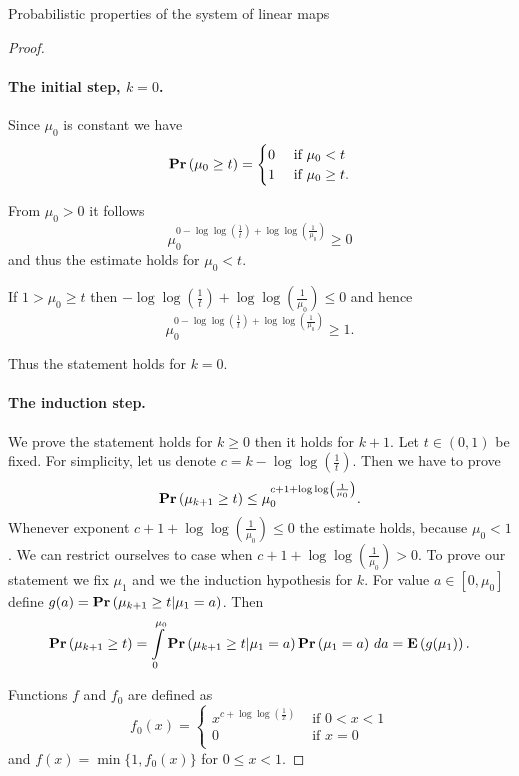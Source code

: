 \begin{section}{Probabilistic properties of the system of linear maps}
\begin{proof}
\paragraph*{The initial step, $k = 0$.}
Since $\mu_0$ is constant we have
\[
	\mathbf{Pr}\left(\mu_0 \geq t\right) = \begin{cases}
		0 & \text{ if } \mu_0 < t \\
		1 & \text{ if } \mu_0 \geq t \text{.} \\
	\end{cases}
\]

From $\mu_0 > 0$ it follows
\[
	\mu_0^{0 - \log \log \left(\frac{1}{t}\right) + \log \log \left(\frac{1}{\mu_0}\right)} \geq 0
\]
and thus the estimate holds for $\mu_0 < t$.

If $1 > \mu_0 \geq t$ then $-\log \log \left(\frac{1}{t}\right) + \log \log \left(\frac{1}{\mu_0}\right) \leq 0$ and hence
\[
	\mu_0^{0 - \log \log \left(\frac{1}{t}\right) + \log \log \left(\frac{1}{\mu_0}\right)} \geq 1 \text{.}
\]

Thus the statement holds for $k = 0$.

\paragraph*{The induction step.} We prove the statement holds for $k \geq 0$ then it holds for $k + 1$. Let $t \in (0, 1)$ be fixed. For simplicity, let us denote $c = k - \log \log \left(\frac{1}{t}\right)$. Then we have to prove
\[
	\mathbf{Pr}\left(\mu_{k + 1} \geq t\right) \leq \mu_0 ^ {c + 1 + \log \log \left(\frac{1}{\mu_0}\right)} \text{.}
\]
Whenever exponent $c + 1 + \log \log \left(\frac{1}{\mu_0}\right) \leq 0$ the estimate holds, because $\mu_0 < 1$. We can restrict ourselves to case when $c + 1 + \log \log \left(\frac{1}{\mu_0}\right) > 0$. To prove our statement we fix $\mu_1$ and we the induction hypothesis for $k$. For value $a \in \left[0, \mu_0\right]$ define $g(a) = \mathbf{Pr}\left(\mu_{k + 1} \geq t | \mu_1 = a\right)$. Then
\[
	\mathbf{Pr}\left(\mu_{k + 1} \geq t\right) = \int\limits_{0}^{\mu_0}\mathbf{Pr}\left(\mu_{k + 1} \geq t | \mu_1 = a\right)\mathbf{Pr}\left(\mu_1 = a\right) \, da = \mathbf{E}\left(g(\mu_1)\right) \text{.}
\]

Functions $f$ and $f_0$ are defined as
\[ 
	f_0(x) = \begin{cases}
		x ^ {c + \log \log \left(\frac{1}{x}\right)} & \text{ if } 0 < x < 1 \\ 
		0 & \text{ if } x = 0 \\
	\end{cases}
\]
and $f(x) = \min \{1, f_0(x) \}$ for $0 \leq x < 1$.


\end{proof}
\end{section}
